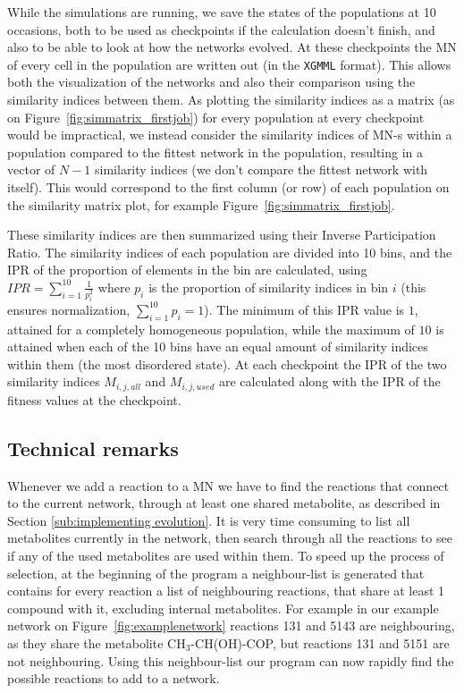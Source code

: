 \documentclass[a4paper,12pt]{article}
\begin{document}
While the simulations are running, we save the states of the populations at 10 occasions, both to be used as checkpoints if the calculation doesn't finish, and also to be able to look at how the networks evolved. At these checkpoints the MN of every cell in the population are written out (in the \texttt{XGMML} format). This allows both the visualization of the networks and also their comparison using the similarity indices between them. As plotting the similarity indices as a matrix (as on Figure~\ref{fig:simmatrix_firstjob}) for every population at every checkpoint would be impractical, we instead consider the similarity indices of MN-s within a population compared to the fittest network in the population, resulting in a vector of $N-1$ similarity indices (we don't compare the fittest network with itself). This would correspond to the first column (or row) of each population on the similarity matrix plot, for example Figure~\ref{fig:simmatrix_firstjob}.

These similarity indices are then summarized using their Inverse Participation Ratio. The similarity indices of each population are divided into 10 bins, and the IPR of the proportion of elements in the bin are calculated, using $IPR= \sum^{10}_{i=1} \frac{1}{p_i^2} $ where $p_i$ is the proportion of similarity indices in bin $i$ (this ensures normalization, $ \sum^{10}_{i=1} p_i=1$). The minimum of this IPR value is $1$, attained for a completely homogeneous population, while the maximum of $10$ is attained when each of the 10 bins have an equal amount of similarity indices within them (the most disordered state). At each checkpoint the IPR of the two similarity indices $M_{i,j,all}$ and $M_{i,j,used}$ are calculated along with the IPR of the fitness values at the checkpoint. 




\subsection{Technical remarks}
\label{sub:technical_bits}


	Whenever we add a reaction to a MN we have to find the reactions that connect to the current network, through at least one shared metabolite, as described in Section \ref{sub:implementing evolution}. It is very time consuming to list all metabolites currently in the network, then search through all the reactions to see if any of the used metabolites are used within them. To speed up the process of selection, at the beginning of the program a neighbour-list is generated that contains for every reaction a list of neighbouring reactions, that share at least 1 compound with it, excluding internal metabolites. For example in our example network on Figure~\ref{fig:examplenetwork} reactions 131 and 5143 are neighbouring, as they share the metabolite CH$_3$-CH(OH)-COP, but reactions 131 and 5151 are not neighbouring. Using this neighbour-list our program can now rapidly find the possible reactions to add to a network. 
\end{document}
